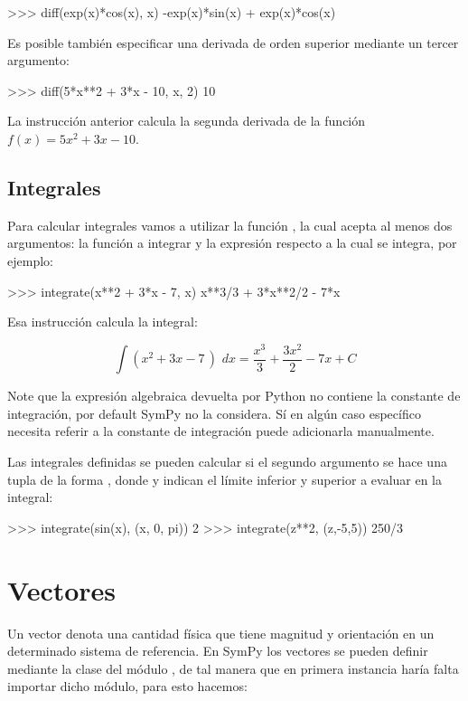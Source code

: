 \begin{python}
>>> diff(exp(x)*cos(x), x)
-exp(x)*sin(x) + exp(x)*cos(x)
\end{python}

Es posible también especificar una derivada de orden superior mediante un tercer argumento:

\begin{python}
>>> diff(5*x**2 + 3*x - 10, x, 2)
10
\end{python}

La instrucción anterior calcula la segunda derivada de la función $ f(x) = 5x^2 + 3x - 10 $. 

\subsection{Integrales}

Para calcular integrales vamos a utilizar la función , la cual acepta al menos dos 
argumentos: la función a integrar y la expresión respecto a la cual se integra, por ejemplo:

\begin{python}
>>> integrate(x**2 + 3*x - 7, x)
x**3/3 + 3*x**2/2 - 7*x
\end{python}

Esa instrucción calcula la integral:

$$ \int \left( x^2 + 3x - 7 \, \right) \,\, dx = \frac{x^3}{3} + \frac{3x^2}{2} - 7x + C $$

Note que la expresión algebraica devuelta por Python no contiene la constante de integración, por default SymPy 
no la considera. Sí en algún caso específico necesita referir a la constante de integración puede adicionarla 
manualmente.

Las integrales definidas se pueden calcular si el segundo argumento se hace una tupla de la forma 
, donde  y  indican el límite inferior y superior a 
evaluar en la integral:

\begin{python}
>>> integrate(sin(x), (x, 0, pi))
2
>>> integrate(z**2, (z,-5,5))
250/3
\end{python}


\section{Vectores}

Un vector denota una cantidad física que tiene magnitud y orientación en un determinado sistema de referencia. 
En SymPy los vectores se pueden definir mediante la clase  del módulo , de tal 
manera que en primera instancia haría falta importar dicho módulo, para esto hacemos:

